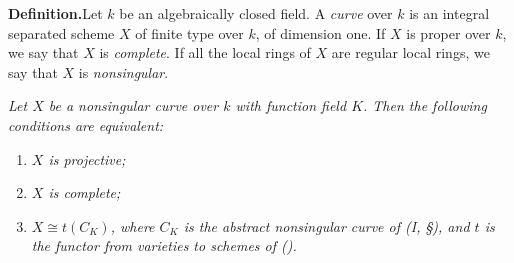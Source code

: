 {\par\smallskip\noindent\textbf{Definition.}\enspace Let $k$ be an algebraically closed field. A \emph{curve} over $k$ is an integral separated scheme $X$ of finite type over $k$, of dimension one. If $X$ is proper over $k$, we say that $X$ is \emph{complete}. If all the local rings of $X$ are regular local rings, we say that $X$ is \emph{nonsingular}.

 \emph{Let $X$ be a nonsingular curve over $k$ with function field $K$. Then the following conditions are equivalent:}
\begin{enumerate}[label=(\roman*),itemsep=0pt,topsep=3pt,parsep=0pt,leftmargin=2.2em]
\item \emph{$X$ is projective;}
\item \emph{$X$ is complete;}
\item \emph{$X\cong t(C_K)$, where $C_K$ is the abstract nonsingular curve of (I, \S{}), and $t$ is the functor from varieties to schemes of ().}
\end{enumerate}
}
